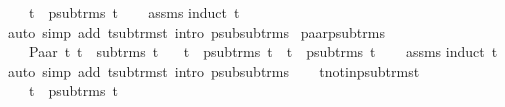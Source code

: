 \begin{isabellebody}
\ \ \ {\isachardoublequoteopen}t{}\ {\isasymin}\ psub{\isacharunderscore}{\kern0pt}trms\ t{}{\isachardoublequoteclose}\isanewline
%
\isadelimproof
\ \ %
\endisadelimproof
%
\isatagproof
{}\isamarkupfalse%
\ assms\isanewline
{}\isamarkupfalse%
{\isacharparenleft}{\kern0pt}induct\ t{}{\isacharparenright}{\kern0pt}\isanewline
{}\isamarkupfalse%
{\isacharparenleft}{\kern0pt}auto\ simp\ add{\isacharcolon}{\kern0pt}\ t{\isacharunderscore}{\kern0pt}sub{\isacharunderscore}{\kern0pt}trms{\isacharunderscore}{\kern0pt}t\ intro{\isacharcolon}{\kern0pt}\ psub{\isacharunderscore}{\kern0pt}sub{\isacharunderscore}{\kern0pt}trms{\isacharparenright}{\kern0pt}\isanewline
{}\isamarkupfalse%
%
\endisatagproof
{\isafoldproof}%
%
\isadelimproof
\isanewline
%
\endisadelimproof
\isanewline
{}\isamarkupfalse%
\ paar{\isacharunderscore}{\kern0pt}psub{\isacharunderscore}{\kern0pt}trms{\isacharcolon}{\kern0pt}\ \isanewline
\ \ \ {\isachardoublequoteopen}Paar\ t{}\ t{}\ {\isasymin}\ sub{\isacharunderscore}{\kern0pt}trms\ t{}{\isachardoublequoteclose}\isanewline
\ \ \ {\isachardoublequoteopen}t{}\ {\isasymin}\ psub{\isacharunderscore}{\kern0pt}trms\ t{}{\isachardoublequoteclose}\ \ {\isachardoublequoteopen}t{}\ {\isasymin}\ psub{\isacharunderscore}{\kern0pt}trms\ t{}{\isachardoublequoteclose}\isanewline
%
\isadelimproof
\ \ %
\endisadelimproof
%
\isatagproof
{}\isamarkupfalse%
\ assms\isanewline
{}\isamarkupfalse%
{\isacharparenleft}{\kern0pt}induct\ t{}{\isacharparenright}{\kern0pt}\isanewline
{}\isamarkupfalse%
{\isacharparenleft}{\kern0pt}auto\ simp\ add{\isacharcolon}{\kern0pt}\ t{\isacharunderscore}{\kern0pt}sub{\isacharunderscore}{\kern0pt}trms{\isacharunderscore}{\kern0pt}t\ intro{\isacharcolon}{\kern0pt}\ psub{\isacharunderscore}{\kern0pt}sub{\isacharunderscore}{\kern0pt}trms{\isacharparenright}{\kern0pt}\isanewline
\ \ \isamarkupfalse%
%
\endisatagproof
{\isafoldproof}%
%
\isadelimproof
\isanewline
%
\endisadelimproof
\isanewline
{}\isamarkupfalse%
\ t{\isacharunderscore}{\kern0pt}not{\isacharunderscore}{\kern0pt}in{\isacharunderscore}{\kern0pt}psub{\isacharunderscore}{\kern0pt}trms{\isacharunderscore}{\kern0pt}t{\isacharcolon}{\kern0pt}\ \isanewline
\ \ \ {\isachardoublequoteopen}t\ {\isasymnotin}\ psub{\isacharunderscore}{\kern0pt}trms\ t{\isachardoublequoteclose}\isanewline

\end{isabellebody}

